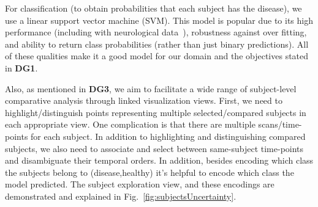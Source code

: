 For classification (to obtain probabilities that each subject has the disease), we use a linear support vector machine (SVM). This model is popular due to its high performance (including with neurological data~\cite{zhang2015detection,dinov2016predictive}), robustness against over fitting, and ability to return class probabilities (rather than just binary predictions). All of these qualities make it a good model for our domain and the objectives stated in \textbf{DG1}. 


Also, as mentioned in \textbf{DG3}, we aim to facilitate a wide range of subject-level comparative analysis through linked visualization views. First, we need to highlight/distinguish points representing multiple selected/compared subjects in each appropriate view. One complication is that there are multiple scans/time-points for each subject. In addition to highlighting and distinguishing compared subjects, we also need to associate and select between same-subject time-points and disambiguate their temporal orders. In addition, besides encoding which class the subjects belong to (disease,healthy) it's helpful to encode which class the model predicted. The subject exploration view, and these encodings are demonstrated and explained in Fig.~\ref{fig:subjectsUncertainty}.



